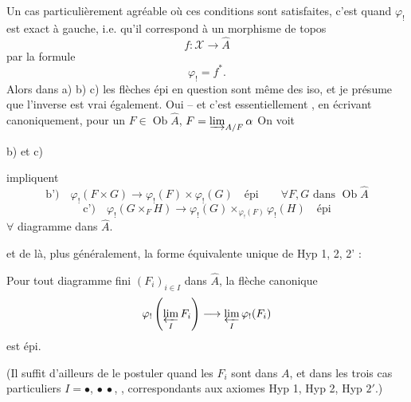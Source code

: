Un cas particulièrement agréable où ces conditions sont satisfaites, c'est quand $\varphi_!$ est exact à gauche, i.e. qu'il correspond  à un morphisme de topos
\[
f:\mathcal X\longrightarrow\widehat A
\]
par la formule
\[
\varphi_!=f^*.
\]
Alors dans a) b) c) les flèches épi en question sont même des iso, et je présume que l'inverse est vrai également. Oui -- et c'est essentiellement , en écrivant canoniquement, pour un $F\in\operatorname{Ob}\widehat A$, $F=\varinjlim_{A/F}\alpha$ \unsure{$\ldots$} On voit

 b) et c)



impliquent
\[
\text{b')}\quad\varphi_!(F\times G)\longrightarrow\varphi_!(F)\times\varphi_!(G)\quad\text{épi}
\qquad\forall F,G\text{ dans }\operatorname{Ob}\widehat A
\]
\[
\text{c')}\quad\varphi_!(G\times_F H)\longrightarrow
\varphi_!(G)\times_{\varphi_!(F)}\varphi_!(H)\quad\text{épi}
\]
$\forall$ diagramme
dans $\widehat A$.

et de là, plus généralement, la forme équivalente unique de Hyp 1, 2, 2' :

Pour tout diagramme fini $(F_i)_{i\in I}$ dans $\widehat A$, la flèche canonique
\[
\varphi_!\left(\varprojlim_I F_i\right)\longrightarrow\varprojlim_I\varphi_!(F_i)
\]
est épi.

(Il suffit d'ailleurs de le postuler quand les $F_i$ sont dans $A$, et dans les trois cas particuliers $I=\bullet$, $\bullet\ \bullet$,
\diagram{\begin{tikzcd}[ampersand replacement=\&,column sep=tiny,row sep=tiny]
\bullet\arrow[dr]\&\&\bullet\arrow[dl]\\
\&\bullet\&
\end{tikzcd}}, correspondants aux axiomes Hyp 1, Hyp 2, Hyp $2'$.)

